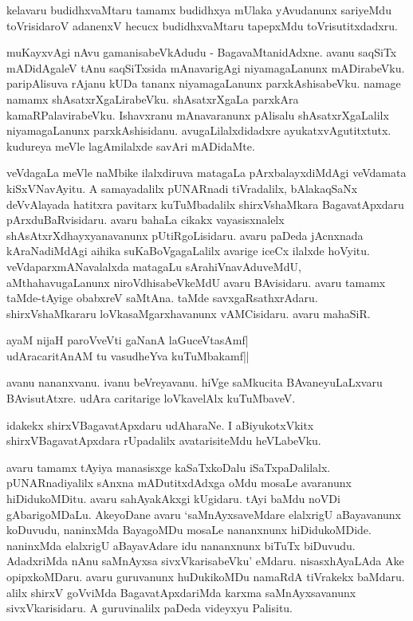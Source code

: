 kelavaru budidhxvaMtaru tamamx budidhxya mUlaka yAvudanunx sariyeMdu toVrisidaroV adanenxV hecucx budidhxvaMtaru tapepxMdu toVrisutitxdadxru.

muKayxvAgi nAvu gamanisabeVkAdudu - BagavaMtanidAdxne. avanu saqSiTx mADidAgaleV tAnu saqSiTxsida mAnavarigAgi niyamagaLanunx mADirabeVku. paripAlisuva rAjanu kUDa tananx niyamagaLanunx parxkAshisabeVku. namage namamx shAsatxrXgaLirabeVku. shAsatxrXgaLa parxkAra kamaRPalavirabeVku. Ishavxranu mAnavaranunx pAlisalu shAsatxrXgaLalilx niyamagaLanunx parxkAshisidanu. avugaLilalxdidadxre ayukatxvAgutitxtutx. kudureya meVle lagAmilalxde savAri mADidaMte.

veVdagaLa meVle naMbike ilalxdiruva matagaLa pArxbalayxdiMdAgi veVdamata kiSxVNavAyitu. A samayadalilx pUNARnadi tiVradalilx, bAlakaqSaNx deVvAlayada hatitxra pavitarx kuTuMbadalilx shirxVshaMkara BagavatApxdaru pArxduBaRvisidaru. avaru bahaLa cikakx vayasisxnalelx shAsAtxrXdhayxyanavanunx pUtiRgoLisidaru. avaru paDeda jAcnxnada kAraNadiMdAgi aihika suKaBoVgagaLalilx avarige iceCx ilalxde hoVyitu. veVdaparxmANavalalxda matagaLu sArahiVnavAduveMdU, aMthahavugaLanunx niroVdhisabeVkeMdU avaru BAvisidaru. avaru tamamx taMde-tAyige obabxreV saMtAna. taMde savxgaRsathxrAdaru. shirxVshaMkararu loVkasaMgarxhavanunx vAMCisidaru. avaru mahaSiR.

\begin{shloka}
ayaM nijaH paroVveVti gaNanA laGuceVtasAmf|\\
udAracaritAnAM tu vasudheYva kuTuMbakamf||
\end{shloka}

avanu nananxvanu. ivanu beVreyavanu. hiVge saMkucita BAvaneyuLaLxvaru BAvisutAtxre. udAra caritarige loVkavelAlx kuTuMbaveV.

idakekx shirxVBagavatApxdaru udAharaNe. I aBiyukotxVkitx shirxVBagavatApxdara rUpadalilx avatarisiteMdu heVLabeVku.

avaru tamamx tAyiya manasisxge kaSaTxkoDalu iSaTxpaDalilalx. pUNARnadiyalilx sAnxna mADutitxdAdxga oMdu mosaLe avaranunx hiDidukoMDitu. avaru sahAyakAkxgi kUgidaru. tAyi baMdu noVDi gAbarigoMDaLu. AkeyoDane avaru `saMnAyxsaveMdare elalxrigU aBayavanunx koDuvudu, naninxMda BayagoMDu mosaLe nananxnunx hiDidukoMDide. naninxMda elalxrigU aBayavAdare idu nananxnunx biTuTx biDuvudu. AdadxriMda nAnu saMnAyxsa sivxVkarisabeVku' eMdaru. nisasxhAyaLAda Ake opipxkoMDaru. avaru guruvanunx huDukikoMDu namaRdA tiVrakekx baMdaru. alilx shirxV goVviMda BagavatApxdariMda karxma saMnAyxsavanunx sivxVkarisidaru. A guruvinalilx paDeda videyxyu Palisitu.

